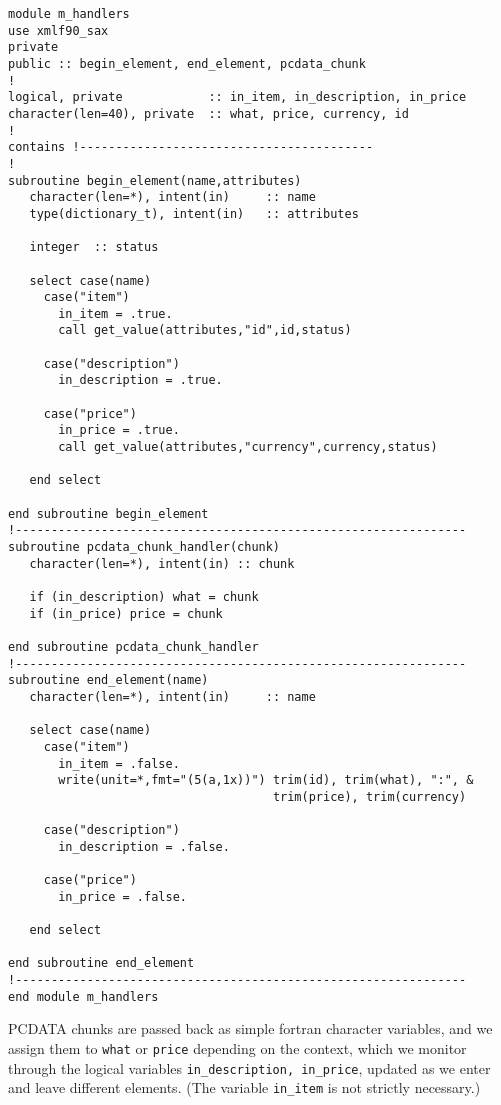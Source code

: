 \documentclass[11pt]{article}
\begin{document}
\begin{verbatim}
module m_handlers
use xmlf90_sax
private
public :: begin_element, end_element, pcdata_chunk
!
logical, private            :: in_item, in_description, in_price
character(len=40), private  :: what, price, currency, id
!
contains !-----------------------------------------
!
subroutine begin_element(name,attributes)
   character(len=*), intent(in)     :: name
   type(dictionary_t), intent(in)   :: attributes
   
   integer  :: status
   
   select case(name)
     case("item")
       in_item = .true.
       call get_value(attributes,"id",id,status)
     
     case("description")
       in_description = .true.
       
     case("price")
       in_price = .true.
       call get_value(attributes,"currency",currency,status)

   end select
   
end subroutine begin_element
!---------------------------------------------------------------
subroutine pcdata_chunk_handler(chunk)
   character(len=*), intent(in) :: chunk

   if (in_description) what = chunk
   if (in_price) price = chunk

end subroutine pcdata_chunk_handler
!---------------------------------------------------------------
subroutine end_element(name)
   character(len=*), intent(in)     :: name
   
   select case(name)
     case("item")
       in_item = .false.
       write(unit=*,fmt="(5(a,1x))") trim(id), trim(what), ":", &
                                     trim(price), trim(currency)
     
     case("description")
       in_description = .false.
       
     case("price")
       in_price = .false.

   end select
   
end subroutine end_element
!---------------------------------------------------------------
end module m_handlers
\end{verbatim}
%
PCDATA chunks are passed back as simple fortran character variables,
and we assign them to \texttt{what} or \texttt{price} depending on the
context, which we monitor through the logical variables
\texttt{in\_description, in\_price}, updated as we enter and leave
different elements. (The variable \texttt{in\_item} is not strictly
necessary.)
\end{document}
